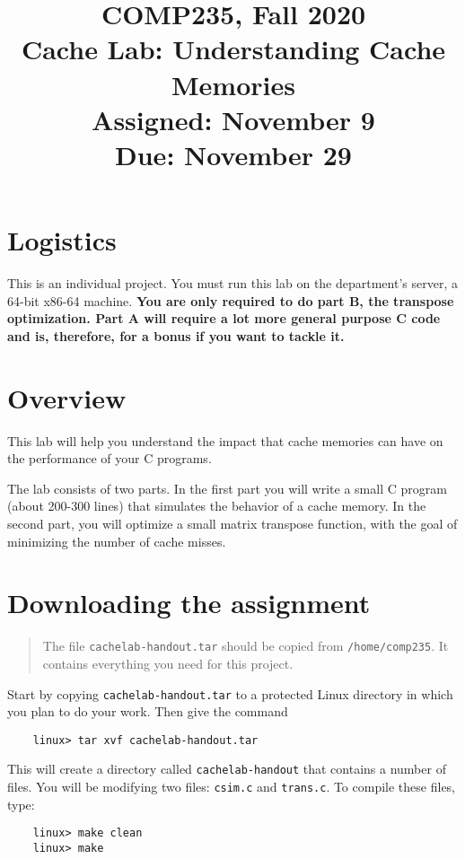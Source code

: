 \documentclass[11pt]{article}
\begin{document}
\title{COMP235, Fall 2020\\
Cache Lab: Understanding Cache Memories\\
Assigned: November 9\\
Due: November 29\\
}

\author{}
\date{}

\maketitle

\section{Logistics}
This is an individual project. You must run this lab on the department's server,
a 64-bit x86-64 machine. \textbf{You are only required to do part B, the transpose
optimization. Part A will require a lot more general purpose C code and is,
therefore, for a bonus if you want to tackle it.}



\section{Overview}
This lab will help you understand the impact that cache memories can
have on the performance of your C programs.

The lab consists of two parts. In the first part you will write a
small C program (about 200-300 lines) that simulates the behavior of a
cache memory.  In the second part, you will optimize a small matrix
transpose function, with the goal of minimizing the number of cache
misses.

\section{Downloading the assignment}

\begin{quote}
The file {\tt cachelab-handout.tar} should be copied from {\tt /home/comp235}. It
contains everything you need for this project.
\end{quote}

Start by copying {\tt cachelab-handout.tar} to a protected Linux directory
in which you plan to do your work.  Then give the command
\begin{verbatim}
    linux> tar xvf cachelab-handout.tar
\end{verbatim}
This will create a directory called {\tt cachelab-handout} that
contains a number of files.  You will be modifying two
files: {\tt csim.c} and {\tt trans.c}.  To compile these files, type:
\begin{verbatim}
    linux> make clean
    linux> make
\end{verbatim}
\end{document}

